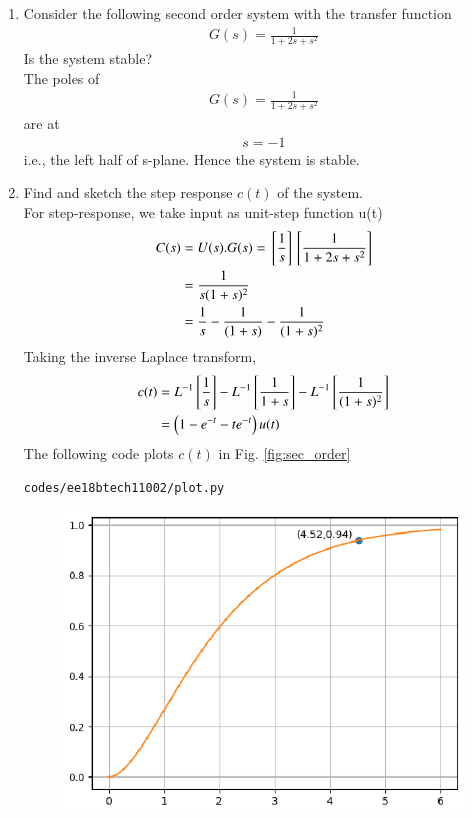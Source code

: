 \begin{enumerate}[label=\thesection.\arabic*.,ref=\thesection.\theenumi]
\item
Consider the following second order system with the transfer function
\begin{align}
G(s) = \frac{1}{1+2s+s^2}
\end{align}
Is the system stable? 
\\
\solution The poles of 
\begin{align}
G(s) = \frac{1}{1+2s+s^2}
\end{align}
are at 
\begin{align}
s = -1
\end{align}
i.e.,  the left half of s-plane.  Hence the system is stable.
\item Find and sketch the step response $c(t)$ of the system.
\\
\solution 
For step-response, we take input as unit-step function u(t)
\begin{align}
C(s) &= U(s).G(s) = {}\left[\frac{1}{s}\right] {}\left[\frac{1}{1+2s+s^2}\right]
\\
&= \frac{1}{s(1+s)^2}
\\
&= \frac{1}{s} - \frac{1}{(1+s)} - \frac{1}{(1+s)^2}
\end{align}
%
Taking the inverse Laplace transform,
%
\begin{align}
c(t) &= L^{-1} \sbrak{ \frac{1}{s}} - L^{-1}\sbrak{\frac{1}{1+s}} - L^{-1}\sbrak{\frac{1}{(1+s)^2}} 
\\
&= \brak{1 - e^{-t} - te^{-t}}  u(t)
\label{eq:sec_order_op}
\end{align}
%
The following code plots $c(t)$ in Fig. \ref{fig:sec_order}
\begin{lstlisting}
codes/ee18btech11002/plot.py
\end{lstlisting}
\begin{figure}
\centering
\includegraphics[width=\columnwidth]{./figs/ee18btech11002.eps}

\end{figure}
\end{enumerate}
